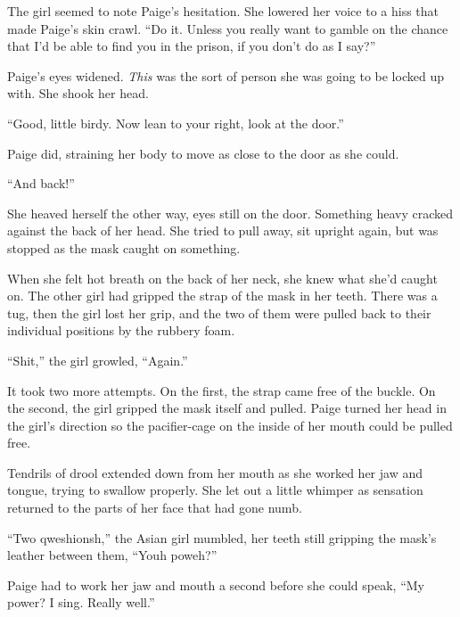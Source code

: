 The girl seemed to note Paige's hesitation.  She lowered her voice to a hiss that made Paige's skin crawl.  ``Do it.  Unless you really want to gamble on the chance that I'd be able to find you in the prison, if you don't do as I say?''



Paige's eyes widened.  \emph{This} was the sort of person she was going to be locked up with.  She shook her head.



``Good, little birdy.  Now lean to your right, look at the door.''



Paige did, straining her body to move as close to the door as she could.



``And back!''



She heaved herself the other way, eyes still on the door.  Something heavy cracked against the back of her head.  She tried to pull away, sit upright again, but was stopped as the mask caught on something.



When she felt hot breath on the back of her neck, she knew what she'd caught on.  The other girl had gripped the strap of the mask in her teeth.  There was a tug, then the girl lost her grip, and the two of them were pulled back to their individual positions by the rubbery foam.



``Shit,'' the girl growled, ``Again.''



It took two more attempts.  On the first, the strap came free of the buckle.  On the second, the girl gripped the mask itself and pulled.  Paige turned her head in the girl's direction so the pacifier-cage on the inside of her mouth could be pulled free.



Tendrils of drool extended down from her mouth as she worked her jaw and tongue, trying to swallow properly.  She let out a little whimper as sensation returned to the parts of her face that had gone numb.



``Two qweshionsh,'' the Asian girl mumbled, her teeth still gripping the mask's leather between them, ``Youh poweh?''



Paige had to work her jaw and mouth a second before she could speak, ``My power?  I sing.  Really well.''



